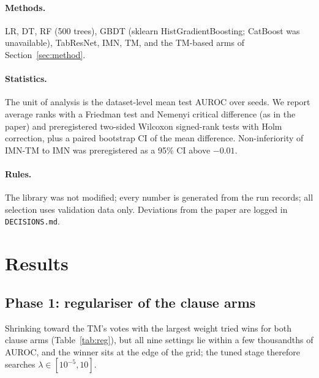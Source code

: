 \documentclass[10pt,a4paper]{article}
\newcommand{\imn}{\textsc{IMN}}
\newcommand{\arm}[1]{\textsf{#1}}
\begin{document}
\paragraph{Methods.} LR, DT, RF (500 trees), GBDT (sklearn HistGradientBoosting; CatBoost was unavailable),
TabResNet, \imn{}, TM, and the TM-based arms of Section~\ref{sec:method}.
\paragraph{Statistics.} The unit of analysis is the dataset-level mean test AUROC over seeds. We report
average ranks with a Friedman test and Nemenyi critical difference (as in the paper) and preregistered
two-sided Wilcoxon signed-rank tests with Holm correction, plus a paired bootstrap CI of the mean
difference. Non-inferiority of \arm{IMN-TM} to \imn{} was preregistered as a 95\% CI above $-0.01$.
\paragraph{Rules.} The library was not modified; every number is generated from the run records; all
selection uses validation data only. Deviations from the paper are logged in \texttt{DECISIONS.md}.

\section{Results}
\subsection{Phase 1: regulariser of the clause arms}\label{sec:reg}
\begin{table}[h]
  \centering\small
  \caption{Mean validation AUROC over 6 datasets $\times$ 3 seeds (\RegRecords{} runs) for the nine
  penalty settings. The selected setting is \texttt{\RegMode}, $\lambda=\RegLambda$.}
  \label{tab:reg}
  
\end{table}
Shrinking toward the TM's votes with the largest weight tried wins for both clause arms
(Table~\ref{tab:reg}), but all nine settings lie within a few thousandths of AUROC, and the winner sits at
the edge of the grid; the tuned stage therefore searches $\lambda\in[10^{-5},10]$.
\end{document}
